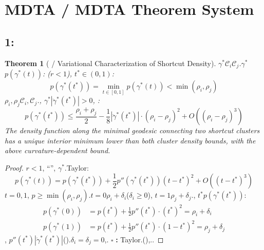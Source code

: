 \documentclass[11pt,a4paper]{article}
\theoremstyle{plain}
\newtheorem{theorem}{Theorem}[section]
\theoremstyle{definition}
\theoremstyle{remark}
\newcommand{\cC}{\mathcal{C}}
\begin{document}
{\section{MDTA / MDTA Theorem System}
\label{sec:mdta-theorems}
\subsection{1:}
\begin{theorem}[ / Variational Characterization of Shortcut Density]
\label{thm:mdta-variational}
$\gamma^*$$\cC_i$$\cC_j$.$\gamma^*$$p(\gamma^*(t))$: ($r < 1$), $t^* \in (0, 1)$: 
\begin{equation}
\boxed{p(\gamma^*(t^*)) = \min_{t \in [0,1]} p(\gamma^*(t)) < \min(\rho_i, \rho_j)}
\end{equation}
$\rho_i, \rho_j$$\cC_i, \cC_j$., $\gamma^*$$|\ddot{\gamma}^*(t^*)| > 0$, : 
\begin{equation}
p(\gamma^*(t^*)) \leq \frac{\rho_i + \rho_j}{2} - \frac{1}{8} |\ddot{\gamma}^*(t^*)| \cdot (\rho_i - \rho_j)^2 + O((\rho_i - \rho_j)^3)
\end{equation}
\textit{The density function along the minimal geodesic connecting two shortcut clusters has a unique interior minimum lower than both cluster density bounds, with the above curvature-dependent bound.}
\end{theorem}
\begin{proof}
$r < 1$, ``'', $\gamma^*$.Taylor: 
\begin{equation}
 p(\gamma^*(t)) = p(\gamma^*(t^*)) + \frac{1}{2} p''(\gamma^*(t^*)) (t - t^*)^2 + O((t - t^*)^3)
\end{equation}
$t = 0, 1$, $p \geq \min(\rho_i, \rho_j)$.$t=0$$\rho_i + \delta_i$($\delta_i \geq 0$), $t=1$$\rho_j + \delta_j$., $t^*$$p(\gamma^*(t^*))$: 
\begin{align}
 p(\gamma^*(0)) &= p(t^*) + \frac{1}{2}p''(t^*) \cdot (t^*)^2 = \rho_i + \delta_i \\
 p(\gamma^*(1)) &= p(t^*) + \frac{1}{2}p''(t^*) \cdot (1-t^*)^2 = \rho_j + \delta_j
\end{align}
, $p''(t^*)$$|\ddot{\gamma}^*(t^*)|$().$\delta_i = \delta_j = 0$,.
$\square$ \textbf{: } Taylor.(),..
\end{proof}
}
\end{document}
